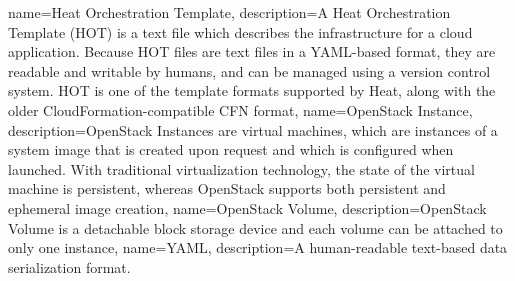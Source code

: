 {
  name={Heat Orchestration Template},
  description={A \gls{Heat} Orchestration Template (HOT) is a text
  file which describes the infrastructure for a cloud application.
  Because HOT files are text files in a \gls{YAML}-based format, they
  are readable and writable by humans, and can be managed using a
  version control system.  HOT is one of the template formats
  supported by Heat, along with the older CloudFormation-compatible
  CFN format},
}
{
  name={OpenStack Instance},
  description={OpenStack Instances are virtual machines, which are
  instances of a system image that is created upon request and which
  is configured when launched. With traditional virtualization
  technology, the state of the virtual machine is persistent, whereas
  OpenStack supports both persistent and ephemeral image creation},
}
{
  name={OpenStack Volume},
  description={OpenStack Volume is a detachable block storage device
  and each volume can be attached to only one instance},
}
{
  name={YAML},
  description={A human-readable text-based data serialization
  format.}
}
